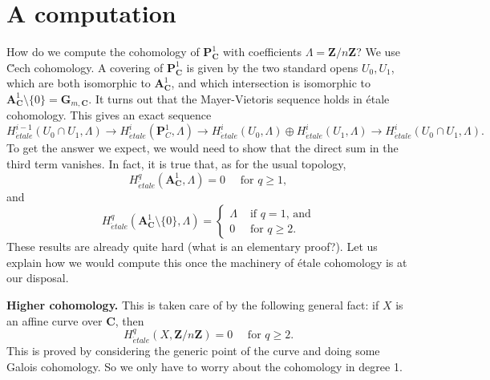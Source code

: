\section{A computation}
\label{section-computation}

\noindent
How do we compute the cohomology of $\mathbf{P}^1_\mathbf{C}$ with coefficients
$\Lambda = \mathbf{Z}/n\mathbf{Z}$?
We use \u Cech cohomology. A covering of $\mathbf{P}^1_\mathbf{C}$ is given by
the two standard opens $U_0, U_1$, which are both
isomorphic to $\mathbf{A}^1_\mathbf{C}$, and which intersection is isomorphic
to $\mathbf{A}^1_\mathbf{C} \setminus \{0\} = \mathbf{G}_{m, \mathbf{C}}$.
It turns out that the Mayer-Vietoris sequence holds in \'etale cohomology.
This gives an exact sequence
$$
H_{\acute{e}tale}^{i-1}(U_0\cap U_1, \Lambda) \to
H_{\acute{e}tale}^i(\mathbf{P}^1_C, \Lambda) \to
H_{\acute{e}tale}^i(U_0, \Lambda) \oplus
H_{\acute{e}tale}^i(U_1, \Lambda) \to H_{\acute{e}tale}^i(U_0\cap U_1,
\Lambda).
$$
To get the answer we expect, we would need to show that the direct sum in the
third term vanishes. In fact, it is true that, as for the usual topology,
$$
H_{\acute{e}tale}^q (\mathbf{A}^1_\mathbf{C}, \Lambda) = 0
\quad \text{ for } q \geq 1,
$$
and
$$
H_{\acute{e}tale}^q (\mathbf{A}^1_\mathbf{C} \setminus \{0\}, \Lambda) = \left\{
\begin{matrix}
\Lambda & \text{ if $q = 1$, and} \\
0 & \text{ for $q \geq 2$.}
\end{matrix}
\right.
$$
These results are already quite hard (what is an elementary proof?). Let us
explain how we would compute this once the machinery of \'etale cohomology is
at our disposal.

\medskip\noindent
{\bf Higher cohomology.} This is taken care of by the following general
fact: if $X$ is an affine curve over $\mathbf{C}$, then
$$
H_{\acute{e}tale}^q (X, \mathbf{Z}/n\mathbf{Z}) = 0 \quad \text{ for } q \geq 2.
$$
This is proved by considering the generic point of the curve and doing some
Galois cohomology. So we only have to worry about the cohomology in degree 1.

